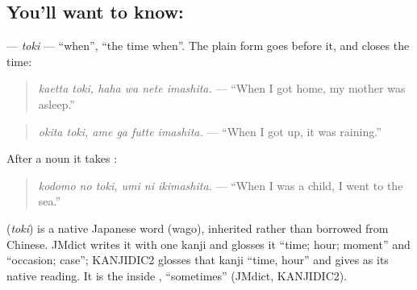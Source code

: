 \subsection*{You'll want to know: }
\textbf{} — \emph{toki} — \textquotedblleft{}when\textquotedblright{}, \textquotedblleft{}the time when\textquotedblright{}. The plain form goes before it, and \textbf{} closes the time:

\begin{quote}
\textbf{  }
\end{quote}

\begin{quote}
\emph{kaetta toki, haha wa nete imashita.} — \textquotedblleft{}When I got home, my mother was asleep.\textquotedblright{}
\end{quote}

\begin{quote}
\textbf{  }
\end{quote}

\begin{quote}
\emph{okita toki, ame ga futte imashita.} — \textquotedblleft{}When I got up, it was raining.\textquotedblright{}
\end{quote}

After a noun it takes \textbf{}:

\begin{quote}
\textbf{  }
\end{quote}

\begin{quote}
\emph{kodomo no toki, umi ni ikimashita.} — \textquotedblleft{}When I was a child, I went to the sea.\textquotedblright{}
\end{quote}

\begin{cousinweb}
\textbf{} (\emph{toki}) is a native Japanese word (wago), inherited rather than borrowed from Chinese. JMdict writes it with one kanji and glosses it \textquotedblleft{}time; hour; moment\textquotedblright{} and \textquotedblleft{}occasion; case\textquotedblright{}; KANJIDIC2 glosses that kanji \textquotedblleft{}time, hour\textquotedblright{} and gives  as its native reading. It is the \textbf{} inside \textbf{}, \textquotedblleft{}sometimes\textquotedblright{} (JMdict, KANJIDIC2).
\end{cousinweb}

